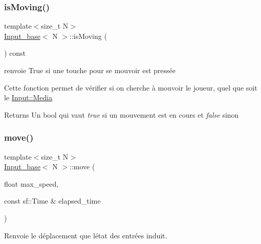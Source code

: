 \mbox{\label{class_input__base_a895ecc7012d6ccdd4284de7d613f2ed2}} 
\subsubsection{\texorpdfstring{is\+Moving()}{isMoving()}}
{\footnotesize\ttfamily template$<$size\+\_\+t N$>$ \\
\mbox{\hyperlink{class_input__base}{Input\+\_\+base}}$<$ N $>$\+::is\+Moving (\begin{DoxyParamCaption}{ }\end{DoxyParamCaption}) const}



renvoie True si une touche pour se mouvoir est pressée 

Cette fonction permet de vérifier si on cherche à mouvoir le joueur, quel que soit le \mbox{\hyperlink{class_input__base_a455585e7933485981b3d7bfcad3a47c6}{Input\+::\+Media}} \begin{DoxyReturn}{Returns}
Un {\ttfamily bool} qui vaut {\itshape true} si un mouvement est en cours et {\itshape false} sinon 
\end{DoxyReturn}
\mbox{\label{class_input__base_a61bba67b702dfd77db2091409ab1d20b}} 
\subsubsection{\texorpdfstring{move()}{move()}}
{\footnotesize\ttfamily template$<$size\+\_\+t N$>$ \\
\mbox{\hyperlink{class_input__base}{Input\+\_\+base}}$<$ N $>$\+::move (\begin{DoxyParamCaption}\item[{float}]{max\+\_\+speed,  }\item[{const sf\+::\+Time \&}]{elapsed\+\_\+time }\end{DoxyParamCaption})}



Renvoie le déplacement que l\textquotesingle{}état des entrées induit. 

